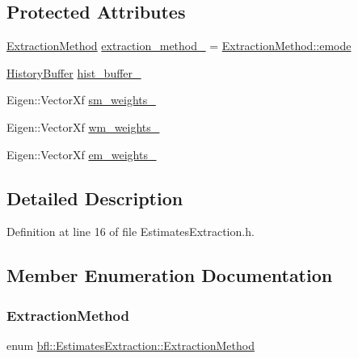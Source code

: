 \subsection*{Protected Attributes}
\begin{DoxyCompactItemize}
\item 
\mbox{\hyperlink{classbfl_1_1EstimatesExtraction_a8489976af4025f0bbc3288ff7f17ffb0}{Extraction\+Method}} \mbox{\hyperlink{classbfl_1_1EstimatesExtraction_a2dcf07e017ecb16b63c882538f74c9bf}{extraction\+\_\+method\+\_\+}} = \mbox{\hyperlink{classbfl_1_1EstimatesExtraction_a8489976af4025f0bbc3288ff7f17ffb0a68aa9a30f26a7648656847fd30c44144}{Extraction\+Method\+::emode}}
\item 
\mbox{\hyperlink{classbfl_1_1HistoryBuffer}{History\+Buffer}} \mbox{\hyperlink{classbfl_1_1EstimatesExtraction_a462d98248435b91eda5195560f598dbd}{hist\+\_\+buffer\+\_\+}}
\item 
Eigen\+::\+Vector\+Xf \mbox{\hyperlink{classbfl_1_1EstimatesExtraction_a4f5676c1de95bdced76d205997a01e2a}{sm\+\_\+weights\+\_\+}}
\item 
Eigen\+::\+Vector\+Xf \mbox{\hyperlink{classbfl_1_1EstimatesExtraction_adf4378ec3f7223050e2616e86cfe69c8}{wm\+\_\+weights\+\_\+}}
\item 
Eigen\+::\+Vector\+Xf \mbox{\hyperlink{classbfl_1_1EstimatesExtraction_a1c56946582ef80ccade49e29fa91efad}{em\+\_\+weights\+\_\+}}
\end{DoxyCompactItemize}


\subsection{Detailed Description}


Definition at line 16 of file Estimates\+Extraction.\+h.



\subsection{Member Enumeration Documentation}
\mbox{\label{classbfl_1_1EstimatesExtraction_a8489976af4025f0bbc3288ff7f17ffb0}} 
\subsubsection{\texorpdfstring{Extraction\+Method}{ExtractionMethod}}
{\footnotesize\ttfamily enum \mbox{\hyperlink{classbfl_1_1EstimatesExtraction_a8489976af4025f0bbc3288ff7f17ffb0}{bfl\+::\+Estimates\+Extraction\+::\+Extraction\+Method}}\hspace{0.3cm}{\ttfamily [strong]}}

